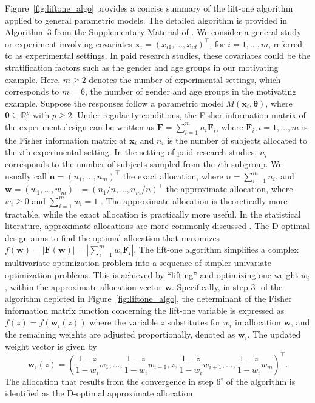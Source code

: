 Figure~\ref{fig:liftone_algo} provides a concise summary of the lift-one algorithm applied to general parametric models. The detailed algorithm is provided in Algorithm~$3$ from the Supplementary Material of \citet{huang2023constrained}. We consider a general study or experiment involving covariates $\mathbf{x}_i = (x_{i1}, \dots, x_{id})^\top$, for $i = 1, \dots, m$, referred to as experimental settings. In paid research studies, these covariates could be the stratification factors such as the gender and age groups in our motivating example. Here, $m \ge 2$ denotes the number of experimental settings, which corresponds to $m=6$, the number of gender and age groups in the motivating example. Suppose the responses follow a parametric model $M(\mathbf x_i, \boldsymbol \theta)$, where $\boldsymbol \theta \subseteq \mathbb{R}^p$ with $p\ge 2$. Under regularity conditions, the Fisher information matrix of the experiment design can be written as $\mathbf F = \sum_{i=1}^m n_i \mathbf F_i$, where $\mathbf F_i, i=1, \dots, m$ is the Fisher information matrix at $\mathbf x_i$ and $n_i$ is the number of subjects allocated to the $i$th experimental setting. In the setting of paid research studies, $n_i$ corresponds to the number of subjects sampled from the $i$th subgroup. We usually call $\mathbf n = (n_1, \dots, n_m)^\top$ the exact allocation, where $n=\sum_{i=1}^m n_i$, and $\mathbf w = (w_1,\dots,w_m)^\top=(n_1/n, \dots, n_m/n)^\top$ the approximate allocation, where $w_i \ge 0$ and $\sum_{i=1}^m w_i = 1$ \citep{kiefer1974, pukelsheim2006optimal, atkinson2007}. The approximate allocation is theoretically more tractable, while the exact allocation is practically more useful. In the statistical literature, approximate allocations are more commonly discussed \citep{kiefer1974}. The D-optimal design aims to find the optimal allocation that maximizes $f({\mathbf w})=|\mathbf F({\mathbf w})|=|\sum_{i=1}^m w_i \mathbf F_i|$. The lift-one algorithm simplifies a complex multivariate optimization problem into a sequence of simpler univariate optimization problems.  This is achieved by ``lifting'' and optimizing one weight $w_i$, within the approximate allocation vector $\mathbf w$. Specifically, in step $3^\circ$ of the algorithm depicted in Figure~\ref{fig:liftone_algo}, the determinant of the Fisher information matrix function concerning the lift-one variable is expressed as $f(z) = f(\mathbf w_i(z))$ where the variable $z$ substitutes for $w_i$ in allocation $\mathbf{w}$, and the remaining weights are adjusted proportionally, denoted as $\mathbf w_i$. The updated weight vector is given by
\[
  \mathbf w_i(z) = \left( \frac{1-z}{1-w_i}w_1, \ldots, \frac{1-z}{1-w_i}w_{i-1}, z, \frac{1-z}{1-w_i}w_{i+1}, \ldots, \frac{1-z}{1-w_i}w_m\right)^\top.
\]
The allocation that results from the convergence in step $6^\circ$ of the algorithm is identified as the D-optimal approximate allocation.

